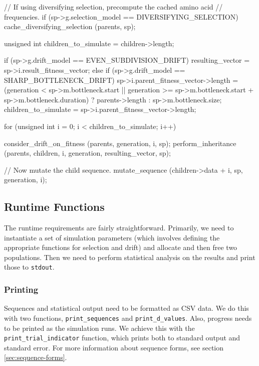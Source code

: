 \documentclass{article}
\begin{document}
\begin{ccode}
{  // If using diversifying selection, precompute the cached amino acid
  // frequencies.
  if (sp->g.selection_model == DIVERSIFYING_SELECTION)
    cache_diversifying_selection (parents, sp);

  unsigned int children_to_simulate = children->length;

  if (sp->g.drift_model == EVEN_SUBDIVISION_DRIFT)
    resulting_vector = sp->i.result_fitness_vector;
  else if (sp->g.drift_model == SHARP_BOTTLENECK_DRIFT) {
    sp->i.parent_fitness_vector->length = (generation < sp->m.bottleneck.start ||
					   generation >= sp->m.bottleneck.start +
							 sp->m.bottleneck.duration) ?
					  parents->length :
					  sp->m.bottleneck.size;
    children_to_simulate = sp->i.parent_fitness_vector->length;
  }

  for (unsigned int i = 0; i < children_to_simulate; i++) {
    consider_drift_on_fitness (parents, generation, i, sp);
    perform_inheritance (parents, children, i, generation, resulting_vector, sp);

    // Now mutate the child sequence.
    mutate_sequence (children->data + i, sp, generation, i);
  }
}
\end{ccode}

    \subsection{Runtime Functions}

      The runtime requirements are fairly straightforward. Primarily, we need to
      instantiate a set of simulation parameters (which involves defining the
      appropriate functions for selection and drift) and allocate and then free
      two populations. Then we need to perform statistical analysis on the
      results and print those to \verb|stdout|.

      \subsubsection{Printing}

	Sequences and statistical output need to be formatted as CSV data. We do
	this with two functions, \verb|print_sequences| and
	\verb|print_d_values|. Also, progress needs to be printed as the
	simulation runs. We achieve this with the \verb|print_trial_indicator|
	function, which prints both to standard output and standard error. For
	more information about sequence forms, see section
	\ref{sec:sequence-forms}.
\end{document}
